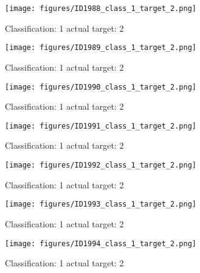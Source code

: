 \begin{figure}[h!]
\begin{center}
\texttt{[image: figures/ID1988\_class\_1\_target\_2.png]}
\end{center}
\caption{ Classification: 1 actual target: 2}
\label{fig:ID1988_class_1_target_2}
\end{figure}
\begin{figure}[h!]
\begin{center}
\texttt{[image: figures/ID1989\_class\_1\_target\_2.png]}
\end{center}
\caption{ Classification: 1 actual target: 2}
\label{fig:ID1989_class_1_target_2}
\end{figure}
\begin{figure}[h!]
\begin{center}
\texttt{[image: figures/ID1990\_class\_1\_target\_2.png]}
\end{center}
\caption{ Classification: 1 actual target: 2}
\label{fig:ID1990_class_1_target_2}
\end{figure}
\begin{figure}[h!]
\begin{center}
\texttt{[image: figures/ID1991\_class\_1\_target\_2.png]}
\end{center}
\caption{ Classification: 1 actual target: 2}
\label{fig:ID1991_class_1_target_2}
\end{figure}
\begin{figure}[h!]
\begin{center}
\texttt{[image: figures/ID1992\_class\_1\_target\_2.png]}
\end{center}
\caption{ Classification: 1 actual target: 2}
\label{fig:ID1992_class_1_target_2}
\end{figure}
\begin{figure}[h!]
\begin{center}
\texttt{[image: figures/ID1993\_class\_1\_target\_2.png]}
\end{center}
\caption{ Classification: 1 actual target: 2}
\label{fig:ID1993_class_1_target_2}
\end{figure}
\begin{figure}[h!]
\begin{center}
\texttt{[image: figures/ID1994\_class\_1\_target\_2.png]}
\end{center}
\caption{ Classification: 1 actual target: 2}
\label{fig:ID1994_class_1_target_2}
\end{figure}
